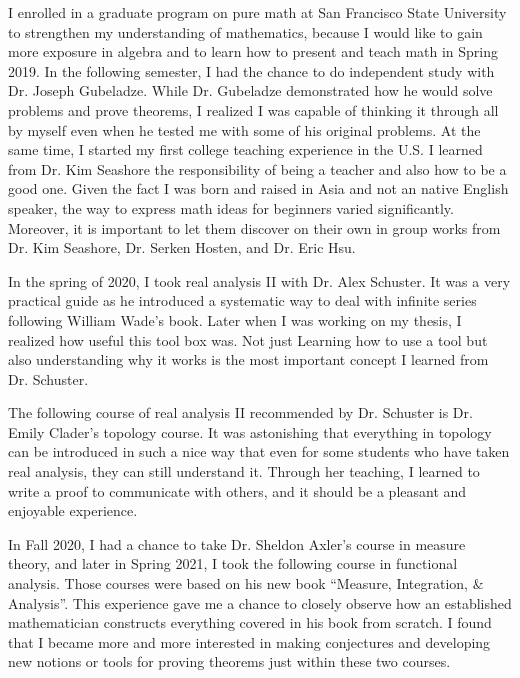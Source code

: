 \documentclass[11pt]{amsart}
\begin{document}
I enrolled in a graduate program on pure math at San Francisco State University to strengthen my understanding of mathematics, because I would like to gain more exposure in algebra and to learn how to present and teach math in Spring 2019. In the following semester, I had the chance to do independent study with Dr. Joseph Gubeladze. While Dr. Gubeladze demonstrated how he would solve problems and prove theorems, I realized I was capable of thinking it through all by myself even when he tested me with some of his original problems. At the same time, I started my first college teaching experience in the U.S. I learned from Dr. Kim Seashore the responsibility of being a teacher and also how to be a good one. Given the fact I was born and raised in Asia and not an native English speaker, the way to express math ideas for beginners varied significantly. Moreover, it is important to let them discover on their own in group works from Dr. Kim Seashore, Dr. Serken Hosten, and Dr. Eric Hsu.

In the spring of 2020, I took real analysis II with Dr. Alex Schuster. It was a very practical guide as he introduced a systematic way to deal with infinite series following William Wade's book. Later when I was working on my thesis, I realized how useful this tool box was. Not just Learning how to use a tool but also understanding why it works is the most important concept I learned from Dr. Schuster.

The following course of real analysis II recommended by Dr. Schuster is Dr. Emily Clader’s topology course. It was astonishing that everything in topology can be introduced in such a nice way that even for some students who have taken real analysis, they can still understand it. Through her teaching, I learned to write a proof to communicate with others, and it should be a pleasant and enjoyable experience.

In Fall 2020, I had a chance to take Dr. Sheldon Axler’s course in measure theory, and later in Spring 2021, I took the following course in functional analysis. Those courses were based on his new book ``Measure, Integration, $\&$ Analysis''.  This experience gave me a chance to closely observe how an established mathematician constructs everything covered in his book from scratch. I found that I became more and more interested in making conjectures and developing new notions or tools for proving theorems just within these two courses.
\end{document}
